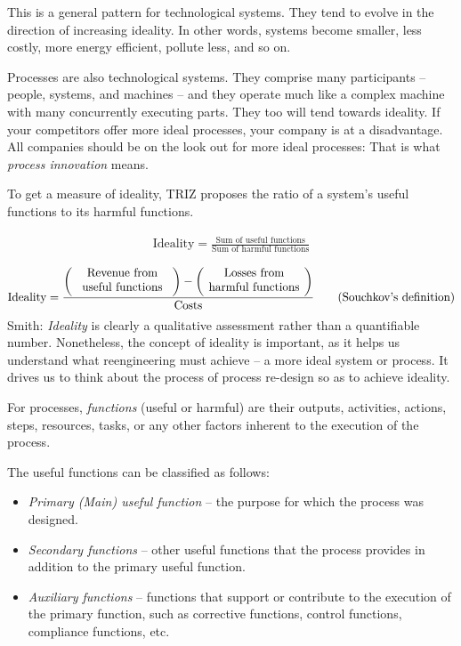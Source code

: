\documentclass[11pt,a4paper]{article}
\begin{document}
This is a general pattern for technological systems. They tend to evolve in
the direction of increasing ideality. In other words, systems become smaller,
less costly, more energy efficient, pollute less, and so on.

Processes are also technological systems. They comprise many participants –
people, systems, and machines – and they operate much like a complex machine
with many concurrently executing parts. They too will tend towards ideality.
If your competitors offer more ideal processes, your company is at a
disadvantage. All companies should be on the look out for more ideal
processes: That is what \emph{process innovation} means.

To get a measure of ideality, TRIZ proposes the ratio of a system’s useful
functions to its harmful functions.

\begin{gather*}
  \text{Ideality}=\frac{\text{Sum of useful functions}}{\text{Sum of harmful
      functions}} \tag{Smith' definition}
\end{gather*}

\begin{gather*}
  \text{Ideality}=\frac{\left(\parbox{3cm}{\centering Revenue from useful
      functions\vskip4pt}\right) - \left(\parbox{3cm}{\centering Losses from
      harmful functions\vskip4pt}\right)}{\text{Costs}} \tag{Souchkov's
    definition}
\end{gather*}
Smith: \emph{Ideality} is clearly a qualitative assessment rather than a
quantifiable number. Nonetheless, the concept of ideality is important, as it
helps us understand what reengineering must achieve – a more ideal system or
process.  It drives us to think about the process of process re-design so as
to achieve ideality.

For processes, \emph{functions} (useful or harmful) are their outputs,
activities, actions, steps, resources, tasks, or any other factors inherent to
the execution of the process.

The useful functions can be classified as follows:
\begin{itemize}
\item \emph{Primary (Main) useful function} – the purpose for which the
  process was designed.
\item \emph{Secondary functions} – other useful functions that the process
  provides in addition to the primary useful function.
\item \emph{Auxiliary functions} – functions that support or contribute to the
  execution of the primary function, such as corrective functions, control
  functions, compliance functions, etc.
\end{itemize}
\end{document}
